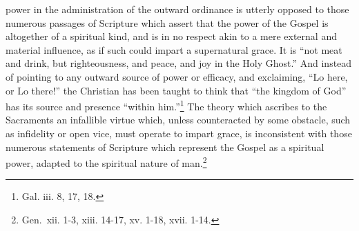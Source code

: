 \documentclass[]{book}
\begin{document}
power in the administration of the outward ordinance is utterly opposed to those numerous passages of Scripture which assert that the power of the Gospel is altogether of a spiritual kind, and is in no respect akin to a mere external and material influence, as if such could impart a supernatural grace. It is ``not meat and drink, but righteousness, and peace, and joy in the Holy Ghost.'' And instead of pointing to any outward source of power or efficacy, and exclaiming, ``Lo here, or Lo there!'' the Christian has been taught to think that ``the kingdom of God'' has its source and presence ``within him.''\footnote{Gal. iii. 8, 17, 18.} The theory which ascribes to the Sacraments an infallible virtue which, unless counteracted by some obstacle, such as infidelity or open vice, must operate to impart grace, is inconsistent with those numerous statements of Scripture which represent the Gospel as a spiritual power, adapted to the spiritual nature of man.\footnote{Gen.~xii. 1-3, xiii. 14-17, xv. 1-18, xvii. 1-14.}
\end{document}
